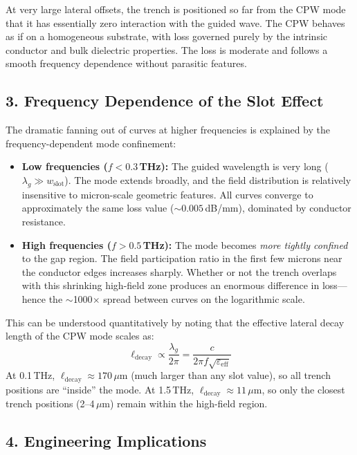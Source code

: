 At very large lateral offsets, the trench is positioned so far from the CPW mode that it has essentially zero interaction with the guided wave. The CPW behaves as if on a homogeneous substrate, with loss governed purely by the intrinsic conductor and bulk dielectric properties. The loss is moderate and follows a smooth frequency dependence without parasitic features.

\subsection*{3. Frequency Dependence of the Slot Effect}

The dramatic fanning out of curves at higher frequencies is explained by the frequency-dependent mode confinement:

\begin{itemize}
    \item \textbf{Low frequencies ($f < 0.3$\,THz):} The guided wavelength is very long ($\lambda_g \gg w_{\mathrm{slot}}$). The mode extends broadly, and the field distribution is relatively insensitive to micron-scale geometric features. All curves converge to approximately the same loss value ($\sim 0.005$\,dB/mm), dominated by conductor resistance.

    \item \textbf{High frequencies ($f > 0.5$\,THz):} The mode becomes \textit{more tightly confined} to the gap region. The field participation ratio in the first few microns near the conductor edges increases sharply. Whether or not the trench overlaps with this shrinking high-field zone produces an enormous difference in loss---hence the $\sim$1000$\times$ spread between curves on the logarithmic scale.
\end{itemize}

This can be understood quantitatively by noting that the effective lateral decay length of the CPW mode scales as:
\begin{equation}
    \ell_{\mathrm{decay}} \propto \frac{\lambda_g}{2\pi} = \frac{c}{2\pi f \sqrt{\varepsilon_{\mathrm{eff}}}}
\end{equation}
At 0.1\,THz, $\ell_{\mathrm{decay}} \approx 170\,\mu$m (much larger than any slot value), so all trench positions are ``inside'' the mode. At 1.5\,THz, $\ell_{\mathrm{decay}} \approx 11\,\mu$m, so only the closest trench positions (2--4\,$\mu$m) remain within the high-field region.

\subsection*{4. Engineering Implications}

